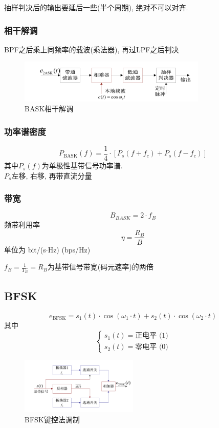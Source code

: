 \documentclass[a4paper]{report}
\begin{document}
抽样判决后的输出要延后一些(半个周期), 绝对不可以对齐. 
\subsubsection{相干解调}
BPF之后乘上同频率的载波(乘法器), 再过LPF之后判决
\begin{figure}[H]
\centering
\includegraphics[width=0.8\textwidth]{bask_co.png}
\caption{BASK相干解调}
\end{figure}
\subsubsection{功率谱密度}
\begin{equation}
  P_{\text{BASK}}(f)=\frac{1}{4}\cdot [P_s(f+f_c)+P_s(f-f_c)]
\end{equation}
其中$P_s(f)$为单极性基带信号功率谱. \\$P_s$左移, 右移, 再带直流分量
\subsubsection{带宽}
\begin{equation}
  B_{BASK}=2\cdot f_B
\end{equation}
频带利用率
\begin{equation}
\eta=\frac{R_B}{B}
\end{equation}
单位为 bit/(s$\cdot$Hz) (bps/Hz)

$f_B=\frac{1}{T_B}=R_B$为基带信号带宽(码元速率)的两倍
\subsection{BFSK}
\begin{equation}
  e_{\text{BFSK}}=s_1(t)\cdot \cos(\omega_1\cdot t)+s_2(t)\cdot\cos(\omega_2\cdot t)
\end{equation}
其中
$$\begin{cases}
  s_1(t)=\text{正电平 (1)}
  \\   s_2(t)=\text{零电平 (0)}
\end{cases}$$

\begin{figure}[H]
\centering
\includegraphics[width=0.5\textwidth]{bfsk_keying.png}
\caption{BFSK键控法调制}
\end{figure}
\end{document}
